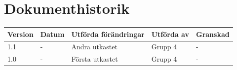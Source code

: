 \documentclass[11pt]{article}
\begin{document}
\tableofcontents

\pagebreak

\section*{Dokumenthistorik}
\begin{table}[h]
\begin{tabular}{|l|l|l|l|l|} \hline

\textbf{Version} & \textbf{Datum} & \textbf{Utförda förändringar} & \textbf{Utförda av} & \textbf{Granskad} \\ \hline
1.1 & - & Andra utkastet & Grupp 4 & - \\ \hline
1.0 & - &  Första utkastet & Grupp 4 & - \\ \hline
\end{tabular}
\end{table}

\pagebreak
{}
\end{document}
